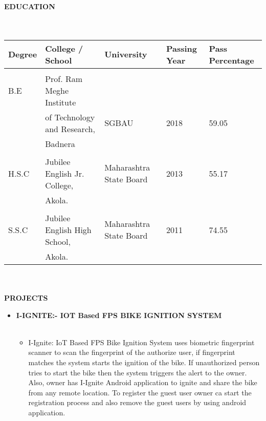 \documentclass[a4paper,20pt]{article}
\newcommand{\lsep}{-0.5cm}
\begin{document}
\textbf{\large{EDUCATION}} \\[\lsep]
\\ \\
\indent \begin{tabular}{ l @{\hskip 0.15in} l @{\hskip 0.15in} l @{\hskip 0.15in} l @{\hskip 0.15in} l }
\hline
\textbf{Degree} & \textbf{College / School} & \textbf{University} & \textbf{Passing Year} & \textbf{Pass Percentage} \\ 
\hline
\\
B.E\,\, & \textsf{Prof. Ram Meghe Institute } \\
  & of Technology and Research,& SGBAU  & 2018 &  59.05 \\ & Badnera   \\ \\
H.S.C  & \textsf{Jubilee English Jr. College,} & Maharashtra State Board & 2013 & 55.17  \\ &  Akola. \\
\\ S.S.C  & \textsf{ Jubilee English High School,} & Maharashtra State Board & 2011 & 74.55  \\ &  Akola. \\
\hline
\end{tabular}
\\ \\





\textbf{\large{PROJECTS}} \\[\lsep]
\begin{itemize}
\item \textbf{I-IGNITE:- IOT Based FPS BIKE IGNITION SYSTEM
}  \\
 \\[-0.6cm]
	\begin{itemize}
		\item[]I-Ignite: IoT Based FPS Bike Ignition System uses biometric fingerprint scanner to scan the fingerprint of the authorize user, if fingerprint matches the system starts the ignition of the bike. If unauthorized person tries to start the bike then the system triggers the alert to the owner. Also, owner has I-Ignite Android application to ignite and share the bike from any remote location. To register the guest user owner ca start the registration process and also remove the guest users by using android application.
		

	\end{itemize}
	\end{itemize}
\end{document}
